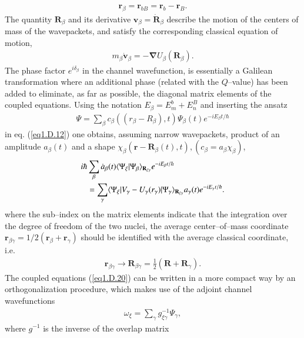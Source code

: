 \begin{subappendices}
\begin{align}\label{eq1.D.17}
\mathbf r_\beta=\mathbf r_{bB}=\mathbf r_b-\mathbf r_B.
\end{align}
The quantity $\mathbf R_\beta$ and its derivative $\mathbf v_\beta=\mathbf{\dot R}_\beta$ describe the motion of the centers of mass of the wavepackets, and satisfy the corresponding classical equation of motion,
\begin{align}\label{eq1.D.18}
m_\beta\mathbf{\dot v}_\beta=-\boldsymbol\nabla U_\beta(\mathbf R_\beta).
\end{align}
The phase factor $e^{i\delta_\beta}$ in the channel wavefunction, is essentially a Galilean transformation where an additional phase (related with the $Q$--value) has been added to eliminate, as far as possible, the diagonal matrix elements of the coupled equations. Using the notation $E_\beta=E_m^b+E_n^B$ and inserting the ansatz
\begin{align}\label{eq1.D.19}
\Psi=\sum_{\beta}c_\beta((r_\beta-R_\beta),t)\Psi_\beta(t)e^{-iE_\beta t/\hbar}
\end{align}
in eq. (\ref{eq1.D.12}) one obtains, assuming narrow wavepackets, product of an amplitude $a_\beta(t)$ and a shape $\chi_\beta(\mathbf r-\mathbf R_\beta(t),t), (c_\beta=a_\beta\chi_\beta)$,
\begin{align}\label{eq1.D.20}
\nonumber i\hbar & \sum_{\beta}\dot a_\beta(t)\langle {\Psi_\xi|\Psi_\beta} \rangle_{\mathbf R_{\xi\gamma}}e^{-iE_\beta t/\hbar}\\
&=\sum_{\gamma}\langle {\Psi_\xi|V_\gamma-U_\gamma(r_\gamma)|\Psi_\gamma} \rangle_{\mathbf R_{\xi\gamma}}a_\gamma(t)e^{-iE_\gamma t/\hbar}.
\end{align}
where the sub--index on the matrix elements indicate that the integration over the degree of freedom of the two nuclei, the average center--of--mass coordinate $\mathbf r_{\beta\gamma}=1/2(\mathbf r_\beta+\mathbf r_\gamma)$ should be identified with the average classical coordinate, i.e.
\begin{align}\label{eq1.D.21}
\mathbf r_{\beta\gamma}\rightarrow\mathbf R_{\beta\gamma}=\frac{1}{2}(\mathbf R+\mathbf R_\gamma).
\end{align}
The coupled equations (\ref{eq1.D.20}) can be written in a more compact way by an orthogonalization procedure, which makes use of the adjoint channel wavefunctions
\begin{align}\label{eq1.D.22}
\omega_\xi=\sum_{\gamma}g^{-1}_{\xi\gamma}\Psi_\gamma,
\end{align}
where $g^{-1}$ is the inverse of the overlap matrix

\end{subappendices}
